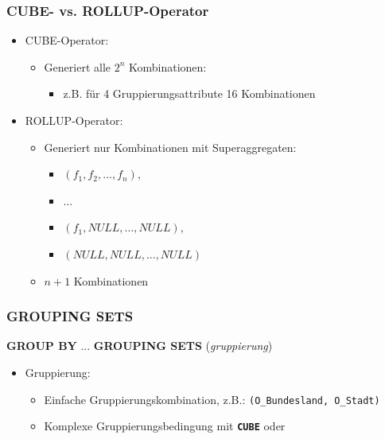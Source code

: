     \begin{frame}
    
    \frametitle{CUBE- vs. ROLLUP-Operator}
    
    
    \begin{itemize}
    \item CUBE-Operator:
      \begin{itemize}
      \item Generiert alle $2^n$ Kombinationen:
        \begin{itemize}
        \item z.B. für 4 Gruppierungsattribute 16 Kombinationen
        \end{itemize}
      \end{itemize}
    \item ROLLUP-Operator:
      \begin{itemize}
      \item Generiert nur Kombinationen mit Superaggregaten:
        \begin{itemize}
        \item $(f_1, f_2, ..., f_n),$
        \item $ ...$
        \item $(f_1, NULL, ..., NULL),$
        \item $(NULL, NULL, ..., NULL)$
        \end{itemize}
      \item $n+1$ Kombinationen
      \end{itemize}
    \end{itemize}
    
    \end{frame}
    
    
    \begin{frame}
    
    \frametitle{GROUPING SETS}
    
    \begin{sql}
        \textbf{GROUP BY} ... \textbf{GROUPING SETS}
        (\textit{gruppierung})
      \end{sql}
    
      \begin{itemize}
    \item Gruppierung:
      \begin{itemize}
      \item Einfache Gruppierungskombination, z.B.: \texttt{(O\_Bundesland,
         O\_Stadt)}
      \item Komplexe Gruppierungsbedingung mit \textbf{\texttt{CUBE}} oder
      \end{itemize}
    \end{itemize}
    
    
    \end{frame}
    
